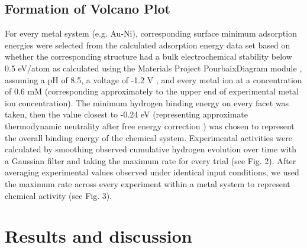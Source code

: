 \documentclass[preprint,12pt]{elsarticle}
\begin{document}
\subsection{Formation of Volcano Plot}\label{Section:Experimental/Volcano}
For every metal system (e.g. Au-Ni), corresponding surface minimum adsorption energies were selected from the calculated adsorption energy data set based on whether the corresponding structure had a bulk electrochemical stability below 0.5 eV/atom as calculated using the Materials Project PourbaixDiagram module \cite{singh2017electrochemical,persson2012prediction,patel2019efficient}, assuming a pH of 8.5, a voltage of -1.2 V \cite{lowry2005single}, and every metal ion at a concentration of 0.6 mM (corresponding approximately to the upper end of experimental metal ion concentration). The minimum hydrogen binding energy on every facet was taken, then the value closest to -0.24 eV (representing approximate thermodynamic neutrality after free energy correction \cite{norskov2005trends}) was chosen to represent the overall binding energy of the chemical system. Experimental activities were calculated by smoothing observed cumulative hydrogen evolution over time with a Gaussian filter and taking the maximum rate for every trial (see Fig. 2). After averaging experimental values observed under identical input conditions, we used the maximum rate across every experiment within a metal system to represent chemical activity (see Fig. 3). 


\section{Results and discussion}\label{Section:Results}
\end{document}
